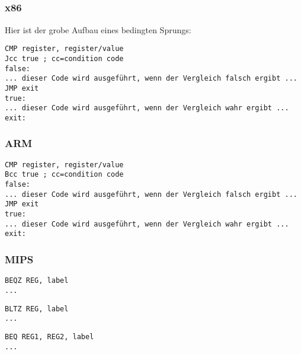 \label{sec:Jcc}






\subsection{\Conclusion{}}

\subsubsection{x86}

Hier ist der grobe Aufbau eines bedingten Sprungs:

\begin{lstlisting}[caption=x86,style=customasmx86]
CMP register, register/value
Jcc true ; cc=condition code
false:
... dieser Code wird ausgeführt, wenn der Vergleich falsch ergibt ...
JMP exit 
true:
... dieser Code wird ausgeführt, wenn der Vergleich wahr ergibt ...
exit:
\end{lstlisting}

\subsubsection{ARM}

\begin{lstlisting}[caption=ARM,style=customasmARM]
CMP register, register/value
Bcc true ; cc=condition code
false:
... dieser Code wird ausgeführt, wenn der Vergleich falsch ergibt ...
JMP exit 
true:
... dieser Code wird ausgeführt, wenn der Vergleich wahr ergibt ...
exit:
\end{lstlisting}

\subsubsection{MIPS}

\begin{lstlisting}[caption=prüfe auf Null,style=customasmMIPS]
BEQZ REG, label
...
\end{lstlisting}
\begin{lstlisting}[caption=Prüfe auf kleiner Null,style=customasmMIPS]
BLTZ REG, label
...
\end{lstlisting}

\begin{lstlisting}[caption=Prüfe auf Gleichheit,style=customasmMIPS]
BEQ REG1, REG2, label
...
\end{lstlisting}


